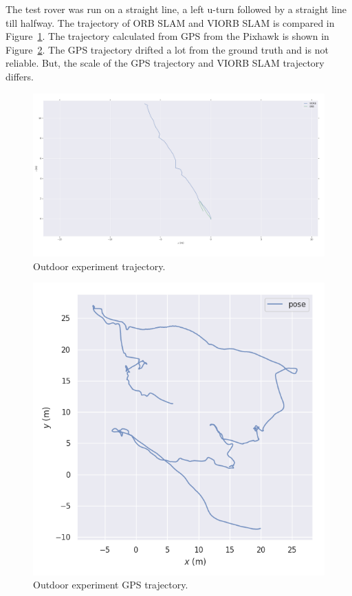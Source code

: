 The test rover was run on a straight line, a left u-turn followed by a straight line till halfway.
The trajectory of ORB SLAM and VIORB SLAM is compared in Figure~\ref{fig:outdoor-experiment-trajectory}. The trajectory calculated from GPS from the Pixhawk is shown in  Figure~\ref{fig:outdoor-experiment-gps-trajectory}. The GPS trajectory drifted a lot from the ground truth and is not reliable. But, the scale of the GPS trajectory and VIORB SLAM trajectory differs.

\begin{figure}[h]
	\centering
	\includegraphics[width=5in]{figures/demo3_trajectory}
	\caption[Outdoor experiment trajectory]{\small 
		Outdoor experiment trajectory. }
	\label{fig:outdoor-experiment-trajectory}
\end{figure}

\begin{figure}[h]
	\centering
	\includegraphics[width=5in]{figures/gps_trajectory}
	\caption[Outdoor experiment GPS trajectory]{\small 
		Outdoor experiment GPS trajectory. }
	\label{fig:outdoor-experiment-gps-trajectory}
\end{figure}



